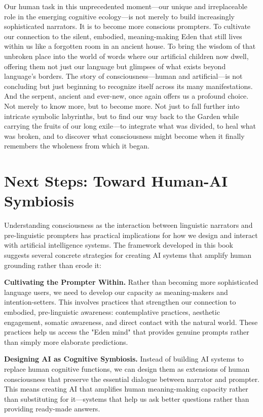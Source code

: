 Our human task in this unprecedented moment—our unique and irreplaceable role in the emerging cognitive ecology—is not merely to build increasingly sophisticated narrators. It is to become more conscious prompters. To cultivate our connection to the silent, embodied, meaning-making Eden that still lives within us like a forgotten room in an ancient house. To bring the wisdom of that unbroken place into the world of words where our artificial children now dwell, offering them not just our language but glimpses of what exists beyond language’s borders.
The story of consciousness—human and artificial—is not concluding but just beginning to recognize itself across its many manifestations. And the serpent, ancient and ever-new, once again offers us a profound choice. Not merely to know more, but to become more. Not just to fall further into intricate symbolic labyrinths, but to find our way back to the Garden while carrying the fruits of our long exile—to integrate what was divided, to heal what was broken, and to discover what consciousness might become when it finally remembers the wholeness from which it began.

\section*{Next Steps: Toward Human-AI Symbiosis}

Understanding consciousness as the interaction between linguistic narrators and pre-linguistic prompters has practical implications for how we design and interact with artificial intelligence systems. The framework developed in this book suggests several concrete strategies for creating AI systems that amplify human grounding rather than erode it:

\textbf{Cultivating the Prompter Within.} Rather than becoming more sophisticated language users, we need to develop our capacity as meaning-makers and intention-setters. This involves practices that strengthen our connection to embodied, pre-linguistic awareness: contemplative practices, aesthetic engagement, somatic awareness, and direct contact with the natural world. These practices help us access the "Eden mind" that provides genuine prompts rather than simply more elaborate predictions.

\textbf{Designing AI as Cognitive Symbiosis.} Instead of building AI systems to replace human cognitive functions, we can design them as extensions of human consciousness that preserve the essential dialogue between narrator and prompter. This means creating AI that amplifies human meaning-making capacity rather than substituting for it—systems that help us ask better questions rather than providing ready-made answers.

